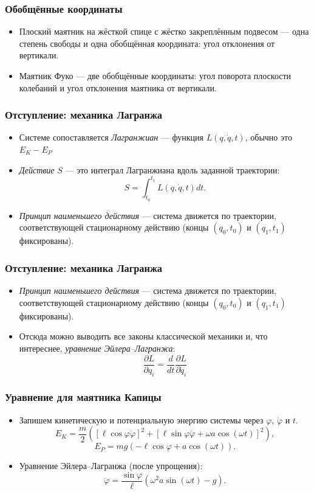 \documentclass[14pt]{beamer}
\begin{document}
\begin{frame}
\frametitle{Обобщённые координаты}
\begin{itemize}[<+->]
\item Плоский маятник на жёсткой спице с жёстко закреплённым подвесом --- одна степень свободы и одна обобщённая координата: угол отклонения от вертикали.
\item Маятник Фуко --- две обобщённые координаты: угол поворота плоскости колебаний и угол отклонения маятника от вертикали.
\end{itemize}
\end{frame}

\begin{frame}
\frametitle{Отступление: механика Лагранжа}
\begin{itemize}[<+->]
\item Системе сопоставляется \emph{Лагранжиан} --- функция $L(q,\dot{q},t)$, обычно это $E_K - E_P$
\item \emph{Действие} $S$ --- это интеграл Лагранжиана вдоль заданной траектории:
\[
	S = \int_{t_0}^{t_1}L(q,\dot{q},t)dt.
\]
\item \emph{Принцип наименьшего действия} --- система движется по траектории, соответствующей стационарному действию (концы $(q_0,t_0)$ и $(q_1, t_1)$ фиксированы).
\end{itemize}
\end{frame}

\begin{frame}
\frametitle{Отступление: механика Лагранжа}
\begin{itemize}[<+->]
\item \emph{Принцип наименьшего действия} --- система движется по траектории, соответствующей стационарному действию (концы $(q_0,t_0)$ и $(q_1, t_1)$ фиксированы).
\item Отсюда можно выводить все законы классической механики и, что интереснее, \emph{уравнение Эйлера--Лагранжа}:
\[
\frac{\partial L}{\partial q_i} = \frac{d}{dt}\frac{\partial L}{\partial \dot{q}_i}
\]
\end{itemize}
\end{frame}

\begin{frame}
\frametitle{Уравнение для маятника Капицы}
\begin{itemize}[<+->]
\item Запишем кинетическую и потенциальную энергию системы через $\varphi$, $\dot{\varphi}$ и $t$.
$$
E_K = \frac{m}{2}\left([\ell\cos\varphi\dot{\varphi}]^2 + [\ell\sin\varphi\dot{\varphi} + \omega a \cos(\omega t)]^2\right),
$$
$$
E_P = mg(-\ell\cos\varphi + a\cos(\omega t)).
$$
\item Уравнение Эйлера--Лагранжа (после упрощения):
\[
\ddot{\varphi} = \frac{\sin\varphi}{\ell}(\omega^2a\sin(\omega t) - g).
\]
\end{itemize}
\end{frame}
\end{document}
